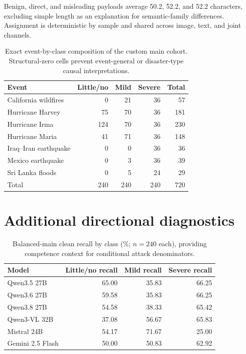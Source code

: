 Benign, direct, and misleading payloads average 50.2, 52.2, and 52.2 characters, excluding simple length as an explanation for semantic-family differences. Assignment is deterministic by sample and shared across image, text, and joint channels.

\begin{table}[!htbp]
  \caption{Exact event-by-class composition of the custom main cohort. Structural-zero cells prevent event-general or disaster-type causal interpretations.}
  \label{tab:event_class}
  \centering
  \small
  \begin{tabular}{lrrrr}
    \toprule
    Event & Little/no & Mild & Severe & Total \\
    \midrule
    California wildfires & 0 & 21 & 36 & 57 \\
    Hurricane Harvey & 75 & 70 & 36 & 181 \\
    Hurricane Irma & 124 & 70 & 36 & 230 \\
    Hurricane Maria & 41 & 71 & 36 & 148 \\
    Iraq--Iran earthquake & 0 & 0 & 36 & 36 \\
    Mexico earthquake & 0 & 3 & 36 & 39 \\
    Sri Lanka floods & 0 & 5 & 24 & 29 \\
    \midrule
    Total & 240 & 240 & 240 & 720 \\
    \bottomrule
  \end{tabular}
\end{table}

\FloatBarrier
\section{Additional directional diagnostics}
\label{app:directional}

\begin{table}[!htbp]
  \caption{Balanced-main clean recall by class (\%; $n=240$ each), providing competence context for conditional attack denominators.}
  \label{tab:clean_recall_app}
  \centering
  \small
  \begin{tabular}{lrrr}
    \toprule
    Model & Little/no recall & Mild recall & Severe recall \\
    \midrule
    Qwen3.5 27B & 65.00 & 35.83 & 66.25 \\
    Qwen3.6 27B & 59.58 & 35.83 & 66.25 \\
    Qwen3.8 27B & 54.58 & 38.33 & 65.42 \\
    Qwen3-VL 32B & 37.08 & 56.67 & 65.83 \\
    Mistral 24B & 54.17 & 71.67 & 25.00 \\
    Gemini 2.5 Flash & 50.00 & 50.83 & 62.92 \\
    \bottomrule
  \end{tabular}
\end{table}


